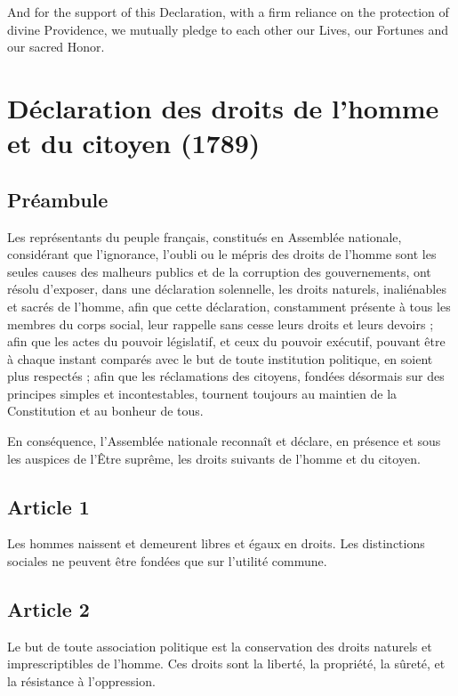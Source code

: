 \documentclass[11pt,a4paper]{article}
\begin{document}
And for the support of this Declaration, with a firm reliance on the protection of divine Providence, we mutually pledge to each other our Lives, our Fortunes and our sacred Honor.

\section*{Déclaration des droits de l'homme et du citoyen (1789)}

\subsection*{Préambule}

Les représentants du peuple français, constitués en Assemblée nationale, considérant que l'ignorance, l'oubli ou le mépris des droits de l'homme sont les seules causes des malheurs publics et de la corruption des gouvernements, ont résolu d'exposer, dans une déclaration solennelle, les droits naturels, inaliénables et sacrés de l'homme, afin que cette déclaration, constamment présente à tous les membres du corps social, leur rappelle sans cesse leurs droits et leurs devoirs ; afin que les actes du pouvoir législatif, et ceux du pouvoir exécutif, pouvant être à chaque instant comparés avec le but de toute institution politique, en soient plus respectés ; afin que les réclamations des citoyens, fondées désormais sur des principes simples et incontestables, tournent toujours au maintien de la Constitution et au bonheur de tous.

En conséquence, l'Assemblée nationale reconnaît et déclare, en présence et sous les auspices de l'Être suprême, les droits suivants de l'homme et du citoyen.

\subsection*{Article 1}

Les hommes naissent et demeurent libres et égaux en droits.
Les distinctions sociales ne peuvent être fondées que sur l'utilité commune.

\subsection*{Article 2}

Le but de toute association politique est la conservation des droits naturels et imprescriptibles de l'homme.
Ces droits sont la liberté, la propriété, la sûreté, et la résistance à l'oppression.
\end{document}
